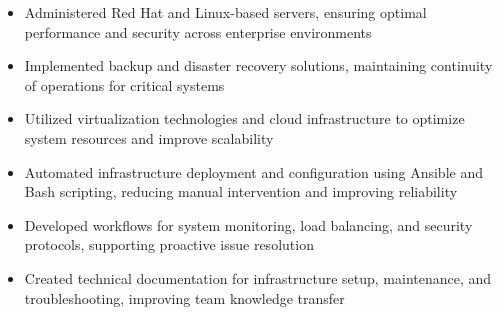 \par\smallskip
\noindent
\begin{minipage}{20cm}
  \begin{minipage}{9.75cm}
    \begin{itemize}
      \item Administered Red Hat and Linux-based servers, ensuring optimal performance and security across enterprise environments
      \item Implemented backup and disaster recovery solutions, maintaining continuity of operations for critical systems
      \item Utilized virtualization technologies and cloud infrastructure to optimize system resources and improve scalability
    \end{itemize}
  \end{minipage}
  \hfill
  \begin{minipage}{9.75cm}
    \begin{itemize}
      \item Automated infrastructure deployment and configuration using Ansible and Bash scripting, reducing manual intervention and improving reliability
      \item Developed workflows for system monitoring, load balancing, and security protocols, supporting proactive issue resolution
      \item Created technical documentation for infrastructure setup, maintenance, and troubleshooting, improving team knowledge transfer
    \end{itemize}
  \end{minipage}
\end{minipage}
\par\smallskip
\divider

